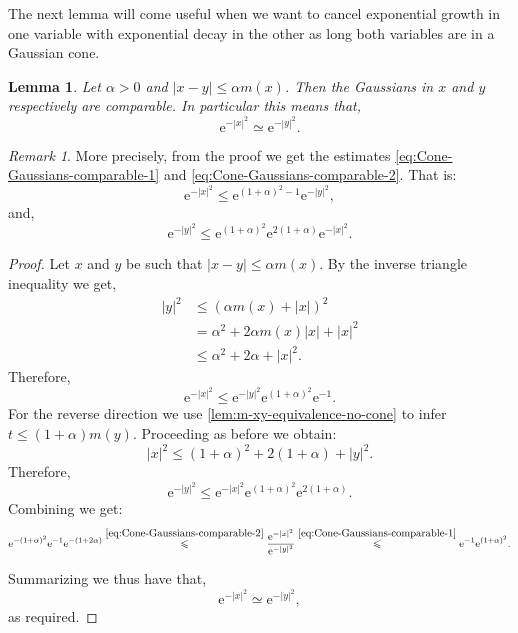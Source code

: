 \documentclass[a4paper,oneside,10pt]{amsproc}
\theoremstyle{plain}
\newtheorem{lemma}{Lemma}
\theoremstyle{remark}
\newtheorem*{remark}{Remark}
\theoremstyle{definition}
\renewcommand{\leq}{\leqslant}
\renewcommand{\leq}{\leqslant}
\newcommand{\e}{\mathrm{e}} %
\renewcommand{\leq}{\leqslant}%
\begin{document}
The next lemma will come useful when we want to cancel exponential
growth in one variable with exponential decay in the other as long
both variables are in a Gaussian cone.
\begin{lemma}\label{lem:Cone-Gaussians-comparable}
  Let $\alpha > 0$ and $|x - y| \leq \alpha m(x)$. Then the Gaussians in $x$ and $y$
  respectively are comparable. In particular this means that,
  \begin{equation*}
    \e^{-|x|^2} \simeq \e^{-|y|^2}.
  \end{equation*}
\end{lemma}
\begin{remark}
  More precisely, from the proof we get the estimates \eqref{eq:Cone-Gaussians-comparable-1}
  and \eqref{eq:Cone-Gaussians-comparable-2}. That is:
  \begin{equation*}
    \e^{-|x|^2} \leq \e^{(1 + \alpha)^2 - 1} \e^{-|y|^2},
  \end{equation*}
  and,
  \begin{equation*}
    \e^{-|y|^2} \leq \e^{(1 + \alpha)^2} \e^{2(1 + \alpha)} \e^{-|x|^2}.
  \end{equation*}
\end{remark}
\begin{proof}
  Let $x$ and $y$ be such that $|x - y| \leq \alpha m(x)$. By the
  inverse triangle inequality we get, 
  \begin{align*}
    |y|^2 &\leq (\alpha m(x) + |x|)^2\\
    &= \alpha^2 + 2 \alpha m(x) |x| + |x|^2\\
    &\leq \alpha^2 + 2 \alpha + |x|^2.
  \end{align*}
  Therefore,
  \begin{equation}
    \label{eq:Cone-Gaussians-comparable-1}
    \e^{-|x|^2} \leq \e^{-|y|^2} \e^{(1 + \alpha)^2} \e^{-1}.
  \end{equation}
  For the reverse direction we use
  \autoref{lem:m-xy-equivalence-no-cone} to infer $t \leq (1 + \alpha)
  m(y)$. Proceeding as before we obtain:
  \begin{equation*}
    |x|^2 \leq (1 + \alpha)^2 + 2(1 + \alpha) + |y|^2.
  \end{equation*}
  Therefore,
  \begin{equation}
    \label{eq:Cone-Gaussians-comparable-2}
    \e^{-|y|^2} \leq \e^{-|x|^2} \e^{(1 + \alpha)^2} \e^{2(1 + \alpha)}.
  \end{equation}
  Combining we get:
  \begin{equation*}
    \e^{-(1 + \alpha)^2} \e^{-1} \e^{-(1 + 2\alpha)}
    \overset{\eqref{eq:Cone-Gaussians-comparable-2}}{\leq} \frac{\e^{-|x|^2}}{\e^{-|y|^2}}
    \overset{\eqref{eq:Cone-Gaussians-comparable-1}}{\leq} \e^{-1} \e^{(1 + \alpha)^2}.
  \end{equation*}

  Summarizing we thus have that,
  \begin{equation*}
    \e^{-|x|^2} \simeq \e^{-|y|^2},
  \end{equation*}
  as required.
\end{proof}
\end{document}
